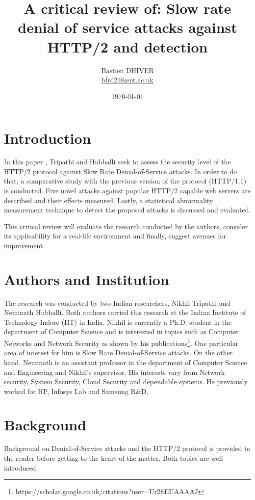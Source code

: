 \documentclass[11pt, a4paper]{article}
\title{A critical review of: Slow rate denial of service attacks against HTTP/2 and detection}
\date{\today}
\author{Bastien DHIVER \\ \href{mailto:bfrd2@kent.ac.uk}{bfrd2@kent.ac.uk}}
\begin{document}
\maketitle
{}

\tableofcontents
\clearpage

\section{Introduction}

In this paper \cite{Tripathi:2018}, Tripathi and Hubballi seek to assess the security level of the HTTP/2 protocol against Slow Rate Denial-of-Service attacks.
In order to do that, a comparative study with the previous version of the protocol (HTTP/1.1) is conducted.
Five novel attacks against popular HTTP/2 capable web servers are described and their effects measured.
Lastly, a statistical abnormality measurement technique to detect the proposed attacks is discussed and evaluated.

This critical review will evaluate the research conducted by the authors, consider its applicability for a real-life environment and finally, suggest avenues for improvement.

\section{Authors and Institution}

The research was conducted by two Indian researchers, Nikhil Tripathi and Neminath Hubballi.
Both authors carried this research at the Indian Institute of Technology Indore (IIT) in India.
Nikhil is currently a Ph.D. student in the department of Computer Science and is interested in topics such as Computer Networks and Network Security as shown by his publications\footnote{https://scholar.google.co.uk/citations?user=Ur2fiEUAAAAJ}.
One particular area of interest for him is Slow Rate Denial-of-Service attacks.
On the other hand, Neminath is an assistant professor in the department of Computer Science and Engineering and Nikhil's supervisor.
His interests vary from Network security, System Security, Cloud Security and dependable systems. He previously worked for HP, Infosys Lab and Samsung R\&D.

\section{Background}

Background on Denial-of-Service attacks and the HTTP/2 protocol is provided to the reader before getting to the heart of the matter.
Both topics are well introduced.
\end{document}
